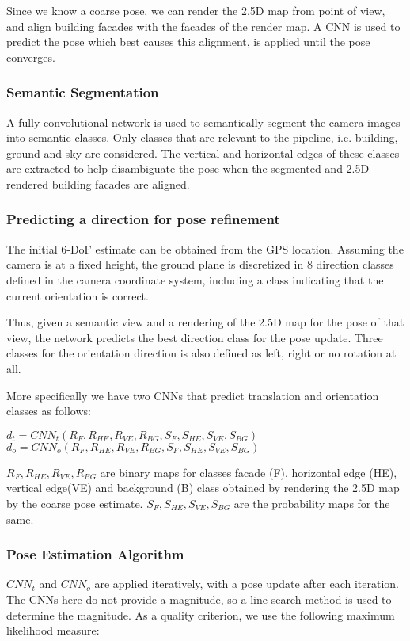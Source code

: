 Since we know a coarse pose, we can render the 2.5D map from point of view, and align building facades with the facades of the render map. A CNN is used to predict the pose which best causes this alignment, is applied until the pose converges. 

\subsubsection{Semantic Segmentation}
A fully convolutional network is used to semantically segment the camera images into semantic classes. Only classes that are relevant to the pipeline, i.e. building, ground and sky are considered. The vertical and horizontal edges of these classes are extracted to help disambiguate the pose when the segmented and 2.5D rendered building facades are aligned.

\subsubsection{Predicting a direction for pose refinement}
The initial 6-DoF estimate can be obtained from the GPS location. Assuming the camera is at a fixed height, the ground plane is discretized in 8 direction classes defined in the camera coordinate system, including a class indicating that the current orientation is correct.

Thus, given a semantic view and a rendering of the 2.5D map for the pose of that view, the network predicts the best direction class for the pose update. Three classes for the orientation direction is also defined as left, right or no rotation at all. 

More specifically we have two CNNs that predict translation and orientation classes as follows:

$d_t = CNN_t(R_F, R_{HE}, R_{VE}, R_{BG},S_F, S_{HE}, S_{VE}, S_{BG})$\\
$d_o = CNN_o(R_F, R_{HE}, R_{VE}, R_{BG},S_F, S_{HE}, S_{VE}, S_{BG})$

$R_F, R_{HE}, R_{VE}, R_{BG}$ are binary maps for classes facade (F), horizontal edge (HE), vertical edge(VE) and background (B) class obtained by rendering the 2.5D map by the coarse pose estimate. $S_F, S_{HE}, S_{VE}, S_{BG}$ are the probability maps for the same.

\subsubsection{Pose Estimation Algorithm}
$CNN_t$ and $CNN_o$ are applied iteratively, with a pose update after each iteration. The CNNs here do not provide a magnitude, so a line search method is used to determine the magnitude. As a quality criterion, we use the following maximum likelihood measure:

